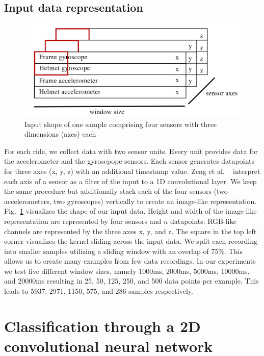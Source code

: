 \documentclass[runningheads]{llncs}
\begin{document}
\FloatBarrier

\subsection{Input data representation}

\begin{figure}
\includegraphics[width=\textwidth]{input_shape.png}
\caption{Input shape of one sample comprising four sensors with three dimensions (axes) each}
\label{fig2}	
\end{figure}

For each ride, we collect data with two sensor units.
Every unit provides data for the accelerometer and the gyroscpope sensors.
Each sensor generates datapoints for three axes (x, y, z) with an additional timestamp value.
Zeng et al. ~\cite{zeng2014convolutional} interpret each axis of a sensor as a filter of the input to a 1D convolutional layer.
We keep the same procedure but additionally stack each of the four sensors (two accelerometers, two gyroscopes) vertically to create an image-like representation.
Fig.~\ref{fig2} visualizes the shape of our input data.
Height and width of the image-like representation are represented by four sensors and $n$ datapoints.
RGB-like channels are represented by the three axes x, y, and z.
The square in the top left corner visualizes the kernel sliding across the input data.
We split each recording into smaller samples utilizing a sliding window with an overlap of 75\%.
This allows us to create many examples from few data recordings.
In our experiments we test five different window sizes, namely 1000ms, 2000ms, 5000ms, 10000ms, and 20000ms resulting in 25, 50, 125, 250, and 500 data points per example.
This leads to 5937, 2971, 1150, 575, and 286 samples respectively.

\section{Classification through a 2D convolutional neural network}
\end{document}
